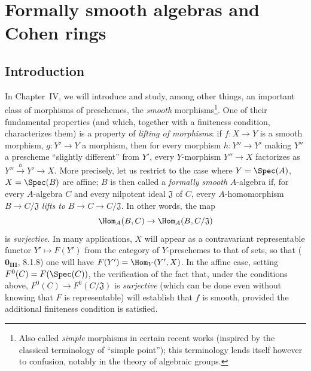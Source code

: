 \section{Formally smooth algebras and Cohen rings}
\label{section:0.19}
\label{0.19}

\setcounter{subsection}{-1}
\subsection{Introduction}
\label{subsection:0.19.0}
\label{0.19.0}

\begin{env}[19.0.1]
\label{0.19.0.1}
In Chapter~IV, we will introduce and study, among other things, an important class of morphisms of preschemes, the \emph{smooth} morphisms\footnote{Also called \emph{simple} morphisms in certain recent works (inspired by the classical terminology of ``simple point''); this terminology lends itself however to confusion, notably in the theory of algebraic groups.}.
One of their fundamental properties (and which, together with a finiteness condition, characterizes them) is a property of \emph{lifting of morphisms}:
if $f:X\to Y$ is a smooth morphism, $g:Y'\to Y$ a morphism, then for every morphism $h:Y''\to Y'$ making $Y''$ a prescheme ``slightly different'' from $Y'$, every $Y$-morphism $Y''\to X$ factorizes as $Y''\xrightarrow{h}Y'\to X$.
More precisely, let us restrict to the case where $Y=\Spec(A)$, $X=\Spec(B)$ are affine;
$B$ is then called a \emph{formally smooth} $A$-algebra if, for every $A$-algebra $C$ and every nilpotent ideal $\mathfrak{J}$ of $C$, every $A$-homomorphism $B\to C/\mathfrak{J}$ \emph{lifts to} $B\to C\to C/\mathfrak{J}$.
In other words, the map
\[
  \Hom_A(B,C) \to \Hom_A(B,C/\mathfrak{J})
\]
is \emph{surjective}.
In many applications, $X$ will appear as a contravariant representable functor $Y'\mapsto F(Y')$ from the category of $Y$-preschemes to that of sets, so that ($\mathbf{0_{III}}$, 8.1.8) one will have $F(Y')=\Hom_Y(Y',X)$.
In the affine case, setting $F^0(C)=F(\Spec(C))$, the verification of the fact that, under the conditions above, $F^0(C)\to F^0(C/\mathfrak{J})$ is \emph{surjective} (which can be done even without knowing that $F$ is representable) will establish that $f$ is smooth, provided the additional finiteness condition is satisfied.
\end{env}

